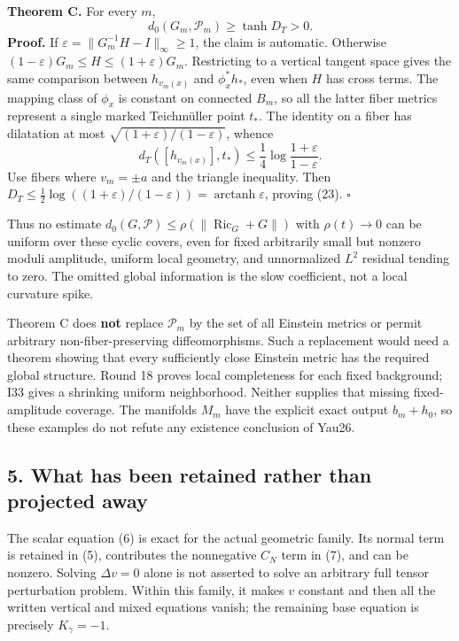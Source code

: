 \documentclass[
  11pt,
]{article}
\begin{document}
\textbf{Theorem C.} For every \(m\), \[
                       d_0(G_m,\mathscr P_m)\ge\tanh D_T>0.
 \tag{23}
\] \textbf{Proof.} If \(\varepsilon=\|G_m^{-1}H-I\|_\infty\ge1\), the
claim is automatic. Otherwise
\((1-\varepsilon)G_m\le H\le(1+\varepsilon)G_m\). Restricting to a
vertical tangent space gives the same comparison between \(h_{v_m(x)}\)
and \(\phi_x^*h_*\), even when \(H\) has cross terms. The mapping class
of \(\phi_x\) is constant on connected \(B_m\), so all the latter fiber
metrics represent a single marked Teichmüller point \(t_*\). The
identity on a fiber has dilatation at most
\(\sqrt{(1+\varepsilon)/(1-\varepsilon)}\), whence \[
 d_T([h_{v_m(x)}],t_*)
             \le\frac14\log\frac{1+\varepsilon}{1-\varepsilon}.
 \tag{24}
\] Use fibers where \(v_m=\pm a\) and the triangle inequality. Then
\(D_T\le\tfrac12\log((1+\varepsilon)/(1-\varepsilon)) =\operatorname{arctanh}\varepsilon\),
proving (23). \(\square\)

Thus no estimate
\(d_0(G,\mathscr P)\le\rho(\|\operatorname{Ric}_G+G\|)\) with
\(\rho(t)\to0\) can be uniform over these cyclic covers, even for fixed
arbitrarily small but nonzero moduli amplitude, uniform local geometry,
and unnormalized \(L^2\) residual tending to zero. The omitted global
information is the slow coefficient, not a local curvature spike.

Theorem C does \textbf{not} replace \(\mathscr P_m\) by the set of all
Einstein metrics or permit arbitrary non-fiber-preserving
diffeomorphisms. Such a replacement would need a theorem showing that
every sufficiently close Einstein metric has the required global
structure. Round 18 proves local completeness for each fixed background;
I33 gives a shrinking uniform neighborhood. Neither supplies that
missing fixed-amplitude coverage. The manifolds \(M_m\) have the
explicit exact output \(b_m+h_0\), so these examples do not refute any
existence conclusion of Yau26.

\hypertarget{what-has-been-retained-rather-than-projected-away}{%
\subsection{5. What has been retained rather than projected
away}\label{what-has-been-retained-rather-than-projected-away}}

The scalar equation (6) is exact for the actual geometric family. Its
normal term is retained in (5), contributes the nonnegative \(C_N\) term
in (7), and can be nonzero. Solving \(\Delta v=0\) alone is not asserted
to solve an arbitrary full tensor perturbation problem. Within this
family, it makes \(v\) constant and then all the written vertical and
mixed equations vanish; the remaining base equation is precisely
\(K_\gamma=-1\).
\end{document}
